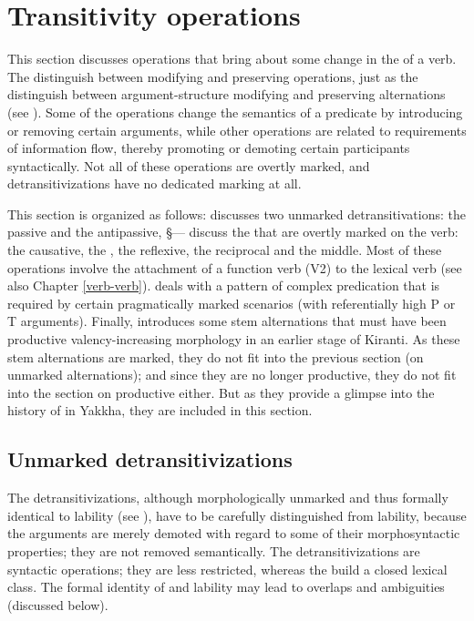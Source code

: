 \section{Transitivity operations}\label{trans-op}

This section discusses operations that bring about some change in the  of a verb. The  distinguish between  modifying and  preserving operations, just as the  distinguish between argument-structure modifying and preserving alternations (see  ). Some of the operations change the semantics of a predicate by introducing or removing certain arguments, while other operations are related to requirements of information flow, thereby promoting or demoting certain participants syntactically. Not all of these operations are overtly marked, and detransitivizations have no dedicated marking at all.  

This section is organized as follows:  discusses two unmarked detransitivations: the passive and the antipassive, §— discuss the  that are overtly marked on the verb: the causative, the , the reflexive, the  reciprocal and the middle. Most of these operations involve the attachment of a function verb  (V2) to the lexical verb (see also Chapter \ref{verb-verb}).  deals with a pattern of complex predication that is required by certain pragmatically marked scenarios (with referentially high P or T arguments). Finally,  introduces some stem alternations that must have been productive valency-increasing morphology  in an earlier stage of Kiranti. As these stem alternations are marked, they do not fit into the previous section (on unmarked alternations); and since they are no longer productive, they do not fit into the section on productive  either. But as they provide a glimpse into the history of  in Yakkha, they are included in this section.

\subsection{Unmarked detransitivizations}\label{detrans}

The detransitivizations, although morphologically unmarked and thus  formally identical to lability (see ), have to be carefully distinguished from lability, because the arguments are merely demoted with regard to some of their morphosyntactic properties; they are not removed semantically. The detransitivizations are syntactic operations; they are less restricted, whereas the  build a closed lexical class. The formal identity of  and lability may lead to overlaps and ambiguities (discussed below).

